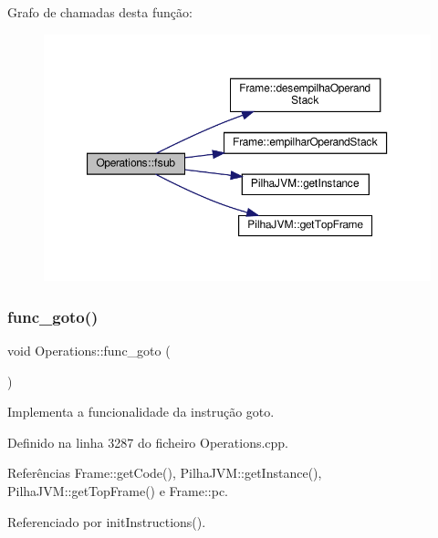 Grafo de chamadas desta função\+:
\nopagebreak
\begin{figure}[H]
\begin{center}
\leavevmode
\includegraphics[width=350pt]{classOperations_a138cd74b7244e430085eb4850de2b481_cgraph}
\end{center}
\end{figure}
\mbox{\label{classOperations_aa4ae9d3899f61ee20ec278152891fe9e}} 
\subsubsection{\texorpdfstring{func\+\_\+goto()}{func\_goto()}}
{\footnotesize\ttfamily void Operations\+::func\+\_\+goto (\begin{DoxyParamCaption}{ }\end{DoxyParamCaption})\hspace{0.3cm}{\ttfamily [private]}}



Implementa a funcionalidade da instrução goto. 



Definido na linha 3287 do ficheiro Operations.\+cpp.



Referências Frame\+::get\+Code(), Pilha\+J\+V\+M\+::get\+Instance(), Pilha\+J\+V\+M\+::get\+Top\+Frame() e Frame\+::pc.



Referenciado por init\+Instructions().

